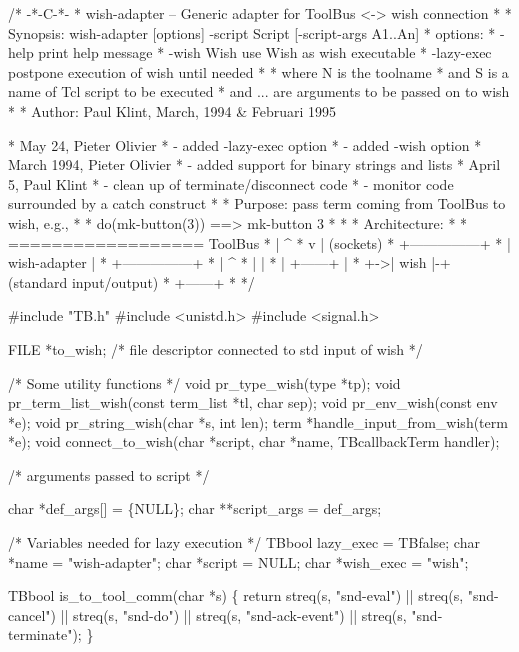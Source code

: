 \endmoddef\let\nwnotused=\nwoutput{}\nwstartdeflinemarkup\nwenddeflinemarkup
/* -*-C-*-
 * wish-adapter -- Generic adapter for ToolBus <-> wish connection
 *
 * Synopsis: wish-adapter [options] -script Script [-script-args A1..An]
 * options:
 *      -help                 print help message
 *      -wish Wish            use Wish as wish executable
 *      -lazy-exec            postpone execution of wish until needed
 *
 * where N is the toolname
 * and   S is a name of Tcl script to be executed
 * and   ... are arguments to be passed on to wish
 *
 * Author: Paul Klint, March, 1994 & Februari 1995

 * May 24, Pieter Olivier
 * - added -lazy-exec option
 * - added -wish option
 * March 1994, Pieter Olivier
 * - added support for binary strings and lists
 * April 5, Paul Klint
 * - clean up of terminate/disconnect code
 * - monitor code surrounded by a catch construct
 *
 * Purpose: pass term coming from ToolBus to wish, e.g.,
 *
 *    do(mk-button(3))  ==> mk-button 3
 *
 *
 * Architecture:
 *
 *         ================== ToolBus
 *           |           ^
 *           v           |    (sockets)
 *         +---------------+
 *         | wish-adapter  |
 *         +---------------+
 *           |           ^
 *           |           |
 *           |  +------+ |
 *           +->| wish |-+    (standard input/output)
 *              +------+
 *
 */

#include "TB.h"
#include <unistd.h>
#include <signal.h>

FILE *to_wish;  /* file descriptor connected to std input of wish */

/* Some utility functions */
void pr_type_wish(type *tp);
void pr_term_list_wish(const term_list *tl, char sep);
void pr_env_wish(const env *e);
void pr_string_wish(char *s, int len);
term *handle_input_from_wish(term *e);
void connect_to_wish(char *script, char *name, TBcallbackTerm handler);

/* arguments passed to script */

char *def_args[] = \{NULL\};
char **script_args = def_args;

/* Variables needed for lazy execution */
TBbool lazy_exec = TBfalse;
char *name = "wish-adapter";
char *script = NULL;
char *wish_exec = "wish";

TBbool is_to_tool_comm(char *s)
\{
  return streq(s, "snd-eval") || streq(s, "snd-cancel") || 
    streq(s, "snd-do") || streq(s, "snd-ack-event") ||
    streq(s, "snd-terminate");
\}

